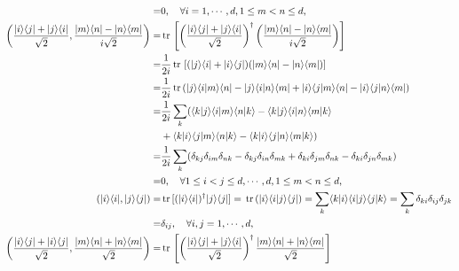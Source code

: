 \documentclass[en]{sol-man}
\begin{document}
\begin{sol}
\begin{itemize}
\begin{itemize}
\begin{align}
                =&0,\quad\forall i=1,\cdots,d,1\leq m<n\leq d,\\
                \notag\left(\frac{\lvert i\rangle\langle j\rvert+\lvert j\rangle\langle i\rvert}{\sqrt{2}},\frac{\lvert m\rangle\langle n\rvert-\lvert n\rangle\langle m\rvert}{i\sqrt{2}}\right)=&\tr\left[\left(\frac{\lvert i\rangle\langle j\rvert+\lvert j\rangle\langle i\rvert}{\sqrt{2}}\right)^{\dagger}\left(\frac{\lvert m\rangle\langle n\rvert-\lvert n\rangle\langle m\rvert}{i\sqrt{2}}\right)\right]\\
                \notag=&\frac{1}{2i}\tr\left[(\lvert j\rangle\langle i\rvert+\lvert i\rangle\langle j\rvert)(\lvert m\rangle\langle n\rvert-\lvert n\rangle\langle m\rvert)\right]\\
                \notag=&\frac{1}{2i}\tr(\lvert j\rangle\langle i\vert m\rangle\langle n\rvert-\lvert j\rangle\langle i\vert n\rangle\langle m\rvert+\lvert i\rangle\langle j\vert m\rangle\langle n\rvert-\lvert i\rangle\langle j\vert n\rangle\langle m\rvert)\\
                \notag=&\frac{1}{2i}\sum_k(\langle k\vert j\rangle\langle i\vert m\rangle\langle n\vert k\rangle-\langle k\vert j\rangle\langle i\vert n\rangle\langle m\vert k\rangle\\
                \notag&+\langle k\vert i\rangle\langle j\vert m\rangle\langle n\vert k\rangle-\langle k\vert i\rangle\langle j\vert n\rangle\langle m\vert k\rangle)\\
                \notag=&\frac{1}{2i}\sum_k(\delta_{kj}\delta_{im}\delta_{nk}-\delta_{kj}\delta_{in}\delta_{mk}+\delta_{ki}\delta_{jm}\delta_{nk}-\delta_{ki}\delta_{jn}\delta_{mk})\\
                =&0,\quad\forall 1\leq i<j\leq d,\cdots,d,1\leq m<n\leq d,\\
                \notag(\lvert i\rangle\langle i\rvert,\lvert j\rangle\langle j\rvert)=&\tr[(\lvert i\rangle\langle i\rvert)^{\dagger}\lvert j\rangle\langle j\rvert]=\tr(\lvert i\rangle\langle i\vert j\rangle\langle j\rvert)=\sum_k\langle k\vert i\rangle\langle i\vert j\rangle\langle j\vert k\rangle=\sum_k\delta_{ki}\delta_{ij}\delta_{jk}\\
                =&\delta_{ij},\quad\forall i,j=1,\cdots,d,\\
                \notag\left(\frac{\lvert i\rangle\langle j\rvert+\lvert i\rangle\langle j\rvert}{\sqrt{2}},\frac{\lvert m\rangle\langle n\rvert+\lvert n\rangle\langle m\rvert}{\sqrt{2}}\right)=&\tr\left[\left(\frac{\lvert i\rangle\langle j\rvert+\lvert j\rangle\langle i\rvert}{\sqrt{2}}\right)^{\dagger}\frac{\lvert m\rangle\langle n\rvert+\lvert n\rangle\langle m\rvert}{\sqrt{2}}\right]\\

\end{align}
\end{itemize}
\end{itemize}
\end{sol}
\end{document}
